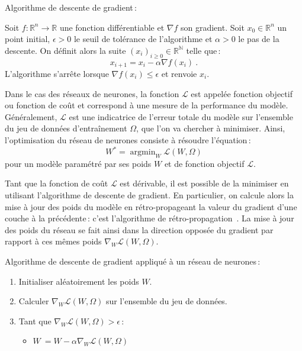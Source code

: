 \begin{definition}
  \label{eq:sgd}
  Algorithme de descente de gradient\,:

  Soit $f : \mathbb{R}^n \rightarrow \mathbb{R}$ une fonction différentiable et $\nabla f$ son gradient. Soit $x_0 \in \mathbb{R}^n$ un point initial, $\epsilon > 0$ le seuil de tolérance de l'algorithme et $\alpha > 0$ le pas de la descente. On définit alors la suite $(x_i)_{i \ge 0} \in \mathbb{R}^\mathbb{N}$ telle que\,:
  $$x_{i+1} = x_i - \alpha \nabla f(x_i)~.$$
  L'algorithme s'arrête lorsque $\nabla f(x_i) \le \epsilon$ et renvoie $x_i$.
\end{definition}

\def\L{\mathcal{L}}

Dans le cas des réseaux de neurones, la fonction $\L$ est appelée \og fonction objectif \fg ou \og fonction de coût \fg et correspond à une mesure de la performance du modèle. Généralement, $\L$ est une indicatrice de l'erreur totale du modèle sur l'ensemble du jeu de données d'entraînement $\Omega$, que l'on va chercher à minimiser. Ainsi, l'optimisation du réseau de neurones consiste à résoudre l'équation\,:
$$W^* = \operatorname{argmin}_W \L(W, \Omega)$$
pour un modèle paramétré par ses poids $W$ et de fonction objectif $\L$.

Tant que la fonction de coût $\L$ est dérivable, il est possible de la minimiser en utilisant l'algorithme de descente de gradient. En particulier, on calcule alors la mise à jour des poids du modèle en rétro-propageant la valeur du gradient d'une couche à la précédente\,: c'est l'algorithme de rétro-propagation~\cite{werbos_beyond_1975,lecun_efficient_1998,rumelhart_learning_1986}. La mise à jour des poids du réseau se fait ainsi dans la direction opposée du gradient par rapport à ces mêmes poids $\nabla_W \L(W, \Omega)$.

\begin{definition}
  Algorithme de descente de gradient appliqué à un réseau de neurones\,:
  \begin{enumerate}
    \item Initialiser aléatoirement les poids $W$.
    \item Calculer $\nabla_W \L(W, \Omega)$ sur l'ensemble du jeu de données.
    \item Tant que $\nabla_W \L(W, \Omega) > \epsilon$\,:
      \begin{itemize}
          \item $W \:= W - \alpha \nabla_W \L(W, \Omega)$
      \end{itemize}
  \end{enumerate}
\end{definition}

